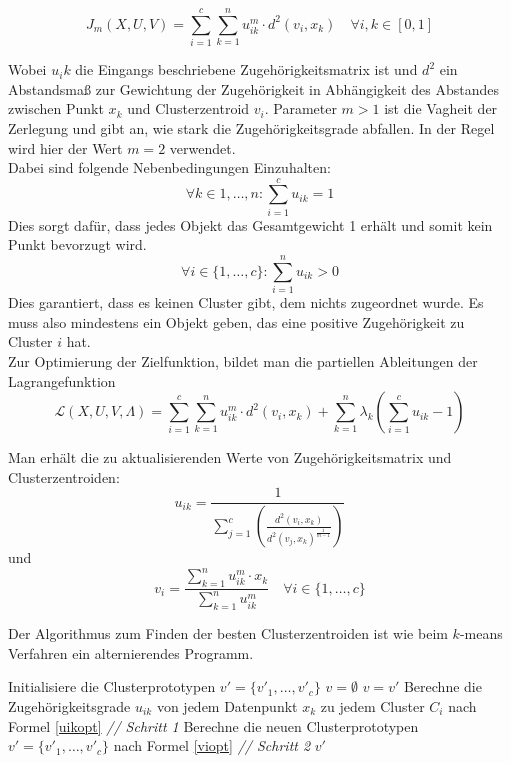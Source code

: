 \documentclass[11pt,ceqn]{book}
\begin{document}
$$J_m(X,U,V) = \sum_{i=1}^{c} \sum_{k=1}^{n} u_{ik}^m \cdot d^2(v_i,x_k) \quad \forall i,k \in [0,1]$$

Wobei $u_ik$ die Eingangs beschriebene Zugehörigkeitsmatrix ist und $d^2$ ein Abstandsmaß zur Gewichtung der Zugehörigkeit in Abhängigkeit des Abstandes zwischen Punkt $x_k$ und Clusterzentroid $v_i$. Parameter $m>1$ ist die Vagheit der Zerlegung und gibt an, wie stark die Zugehörigkeitsgrade abfallen. In der Regel wird hier der Wert $m=2$ verwendet.
\\
Dabei sind folgende Nebenbedingungen Einzuhalten:
$$\forall k \in {1, \dots, n} : \sum_{i=1}^c u_{ik} = 1$$
Dies sorgt dafür, dass jedes Objekt das Gesamtgewicht 1 erhält und somit kein Punkt bevorzugt wird.
$$\forall i \in \{1, \dots, c\} : \sum_{i=1}^n u_{ik} > 0$$
Dies garantiert, dass es keinen Cluster gibt, dem nichts zugeordnet wurde. Es muss also mindestens ein Objekt geben, das eine positive Zugehörigkeit zu Cluster $i$ hat.
\\
Zur Optimierung der Zielfunktion, bildet man die partiellen Ableitungen der Lagrangefunktion 
$$\mathcal{L}(X, U, V , \Lambda) = \sum_{i=1}^{c} \sum_{k=1}^{n} u_{ik}^m \cdot d^2(v_i,x_k) + \sum_{k=1}^n \lambda_k \left(\sum_{i=1}^c u_{ik} - 1\right)$$

Man erhält die zu aktualisierenden Werte von Zugehörigkeitsmatrix und Clusterzentroiden:
\begin{equation} \label{uikopt}
u_{ik} = \frac{1}{\sum\limits_{j=1}^c \left(\frac{d^2(v_i, x_k)}{d^2(v_j, x_k)^{\frac{1}{m-1}}}\right)}
\end{equation}
und
\begin{equation} \label{viopt}
v_i = \frac{\sum\limits_{k=1}^n u_{ik}^m \cdot x_k}{\sum\limits_{k=1}^n u_{ik}^m}  \quad \forall i \in \{1, \dots, c\}
\end{equation}


Der Algorithmus zum Finden der besten Clusterzentroiden ist wie beim $k$-means Verfahren ein alternierendes Programm.
\begin{algorithm}
\caption{$FCM(X,c,m,\epsilon)$}\label{fcm}
\begin{algorithmic}[1]
\State Initialisiere die Clusterprototypen $v' = \{v'_1, \dots, v'_c\}$
\State $v = \emptyset$
\Repeat
\State $v=v'$
\State Berechne die Zugehörigkeitsgrade $u_{ik}$ von jedem Datenpunkt $x_k$ zu jedem Cluster $C_i$ nach \hspace*{5mm} Formel \eqref{uikopt} \textit{// Schritt 1}
\State Berechne die neuen Clusterprototypen $v' = \{v'_1, \dots, v'_c\}$ nach Formel \eqref{viopt} \textit{// Schritt 2}
\State \Return $v'$
\end{algorithmic}
\end{algorithm}
\end{document}
